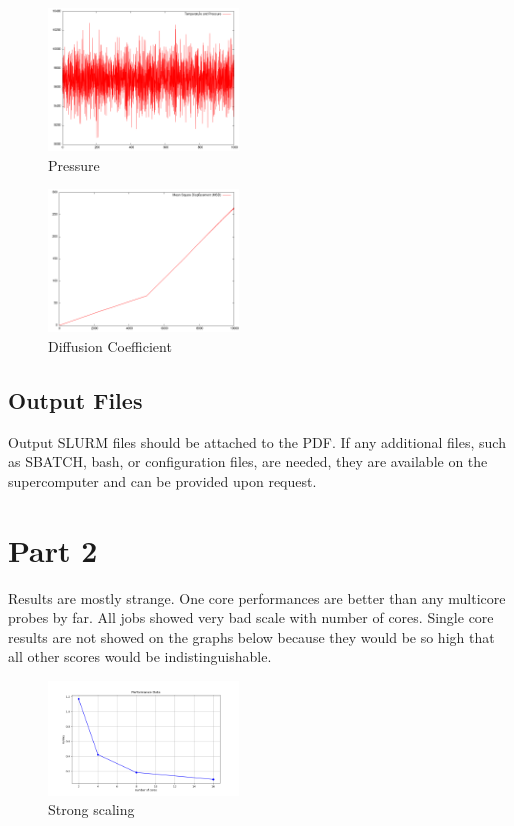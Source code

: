 \documentclass[a4paper,11pt]{article}
\begin{document}
\begin{figure}[htbp]
    \centering
    \includegraphics[width=0.45\textwidth]{eql2-temp.png}
    \caption{Pressure}
    \label{fig:pressure}
\end{figure}

\begin{figure}[htbp]
    \centering
    \includegraphics[width=0.45\textwidth]{prd-msd.png}
    \caption{Diffusion Coefficient}
    \label{fig:diff_coeff}
\end{figure}
\newpage

\subsection{Output Files}
Output SLURM files should be attached to the PDF. If any additional files, such as SBATCH, bash, or configuration files, are needed, they are available on the supercomputer and can be provided upon request.

\section{Part 2}
Results are mostly strange. One core performances are better than any multicore probes by far. All jobs showed very bad scale with number of cores. Single core results are not showed on the graphs below because they would be so high that all other scores would be indistinguishable.

\begin{figure}[htbp]
    \centering
    \includegraphics[width=0.45\textwidth]{job_error_strong.png}
    \caption{Strong scaling}
    \label{fig:strong}
\end{figure}
\end{document}
